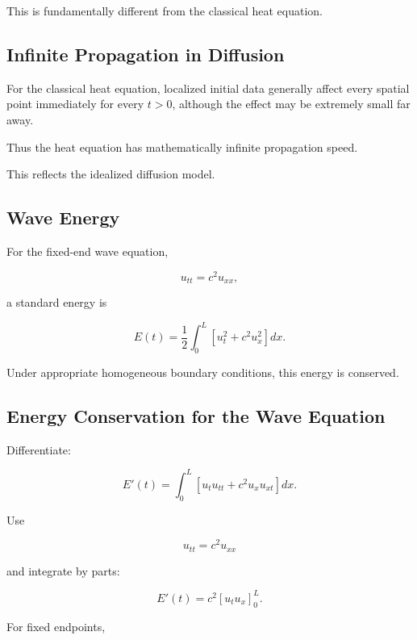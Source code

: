This is fundamentally different from the classical heat equation.

\subsection{Infinite Propagation in Diffusion}
\label{subsec:infinite-propagation-heat}

For the classical heat equation, localized initial data generally affect
every spatial point immediately for every \(t>0\), although the effect may
be extremely small far away.

Thus the heat equation has mathematically infinite propagation speed.

This reflects the idealized diffusion model.

\subsection{Wave Energy}
\label{subsec:wave-energy}

For the fixed-end wave equation,

\[
u_{tt}=c^2u_{xx},
\]

a standard energy is

\[
\boxed{
E(t)
=
\frac12
\int_0^L
\left[
u_t^2
+
c^2u_x^2
\right]
dx.
}
\]

Under appropriate homogeneous boundary conditions, this energy is
conserved.

\subsection{Energy Conservation for the Wave Equation}
\label{subsec:wave-energy-conservation}

Differentiate:

\[
E'(t)
=
\int_0^L
\left[
u_tu_{tt}
+
c^2u_xu_{xt}
\right]
dx.
\]

Use

\[
u_{tt}=c^2u_{xx}
\]

and integrate by parts:

\[
E'(t)
=
c^2
\left[
u_tu_x
\right]_0^L.
\]

For fixed endpoints,

